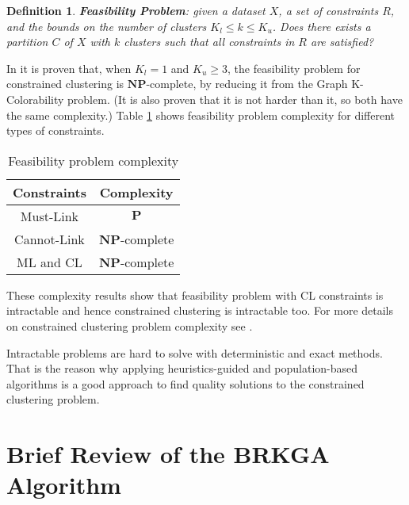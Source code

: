 \documentclass[review]{elsarticle}
\newtheorem{definition}{Definition}
\begin{document}
\begin{definition}
	
	\textbf{Feasibility Problem}: given a dataset $X$, a set of constraints $R$, and the bounds on the number of clusters $K_l \leq k \leq K_u$. Does there exists a partition $C$ of $X$ with $k$ clusters such that all constraints in $R$ are satisfied? \cite{davidson2005clustering}
	\label{def1}
	
\end{definition}

In \cite{davidson2005clustering} it is proven that, when $K_l = 1$ and $K_u \ge 3$, the feasibility problem for constrained clustering is $\mathbf{NP}$-complete, by reducing it from the Graph K-Colorability problem. (It is also proven that it is not harder than it, so both have the same complexity.) Table \ref{tab:feasibility} shows feasibility problem complexity for different types of constraints.

\begin{table}[!h]
	\centering
	\setlength{\tabcolsep}{7pt}
	\renewcommand{\arraystretch}{0.9}
		\begin{tabular}{c c}
			\hline
			Constraints & Complexity \\
			\hline
			Must-Link & $\mathbf{P}$\\
			Cannot-Link & $\mathbf{NP}$-complete\\
			ML and CL & $\mathbf{NP}$-complete\\
			\hline
			
		\end{tabular}%
	\caption{Feasibility problem complexity \cite{davidson2005clustering}}
	\label{tab:feasibility}
\end{table}

These complexity results show that feasibility problem with CL constraints is intractable and hence constrained clustering is intractable too. For more details on constrained clustering problem complexity see \cite{davidson2005clustering}.

Intractable problems are hard to solve with deterministic and exact methods. That is the reason why applying heuristics-guided and population-based algorithms is a good approach to find quality solutions to the constrained clustering problem.


\section{Brief Review of the BRKGA Algorithm}
\end{document}
